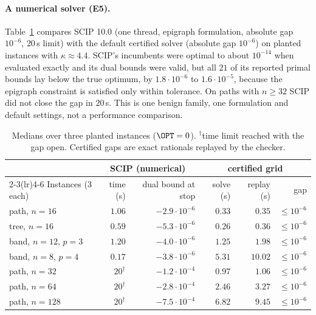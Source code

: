 \paragraph{A numerical solver (E5).} Table~\ref{exp:tab:e5} compares SCIP 10.0
(one thread, epigraph formulation, absolute gap $10^{-6}$, $20$\,s limit)
with the default certified solver (absolute gap $10^{-6}$) on planted
instances with $\kappa\approx4.4$. SCIP's incumbents were optimal to about
$10^{-14}$ when evaluated exactly and its dual bounds were valid, but all
$21$ of its reported primal bounds lay below the true optimum, by $1.8\cdot
10^{-6}$ to $1.6\cdot10^{-5}$, because the epigraph constraint is satisfied
only within tolerance. On paths with $n\ge32$ SCIP did not close the gap in
$20$\,s. This is one benign family, one formulation and default settings,
not a performance comparison.

\begin{table}[ht]\centering\small
\begin{tabular}{lrrrrr}
\toprule
& \multicolumn{2}{c}{SCIP (numerical)} & \multicolumn{3}{c}{certified grid}\\
\cmidrule(lr){2-3}\cmidrule(lr){4-6}
Instances (3 each) & time (s) & dual bound at stop & solve (s) & replay (s) & gap\\
\midrule
path, $n=16$ & $1.06$ & $-2.9\cdot10^{-6}$ & $0.33$ & $0.35$ & $\le10^{-6}$\\
tree, $n=16$ & $0.59$ & $-5.3\cdot10^{-6}$ & $0.26$ & $0.36$ & $\le10^{-6}$\\
band, $n=12$, $p=3$ & $1.20$ & $-4.0\cdot10^{-6}$ & $1.25$ & $1.98$ & $\le10^{-6}$\\
band, $n=8$, $p=4$ & $0.17$ & $-3.8\cdot10^{-6}$ & $5.31$ & $10.02$ & $\le10^{-6}$\\
path, $n=32$ & $20^\dagger$ & $-1.2\cdot10^{-4}$ & $0.97$ & $1.06$ & $\le10^{-6}$\\
path, $n=64$ & $20^\dagger$ & $-2.8\cdot10^{-4}$ & $2.46$ & $3.27$ & $\le10^{-6}$\\
path, $n=128$ & $20^\dagger$ & $-7.5\cdot10^{-4}$ & $6.82$ & $9.45$ & $\le10^{-6}$\\
\bottomrule
\end{tabular}
\caption{Medians over three planted instances ($\OPT=0$). $^\dagger$time
limit reached with the gap open. Certified gaps are exact rationals replayed
by the checker.}
\label{exp:tab:e5}
\end{table}
